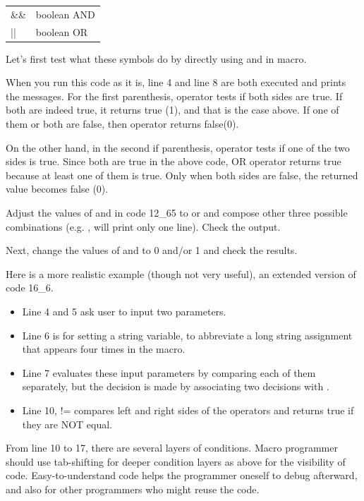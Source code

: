 \begin{indentCom}
 \begin{tabular*}{0.5\textwidth}{ l l }
\&\& & boolean AND\\
|| & boolean OR\\
\end{tabular*}
\end{indentCom}

Let's first test what these symbols do by directly using
 and  in macro.

When you run this code as it is, line 4 and line 8 are both executed and prints
the messages. For the first  parenthesis, \ilcom{\&\&} operator tests if
both sides are true. If both are indeed true, it returns true (1), and that is
the case above. If one of them or both are false, then \ilcom{\&\&}
operator returns false(0). 

On the other hand, in the second if parenthesis,
\ilcom{||} operator tests if one of the two sides is true. Since both are
true in the above code, OR operator returns true because at least one of them is
true. Only when both sides are false, the returned value becomes false (0).

\begin{indentexercise}{1}
Adjust the values of  and  in code 12\_65 to  or  and
compose other three possible combinations (e.g. ,  will print
only one line). Check the output.

Next, change the values of  and  to 0 and/or
1 and check the results. 
\end{indentexercise}

Here is a more realistic example (though not very useful), an extended version
of code 16\_6.

\begin{itemize}
\item Line 4 and 5 ask user to input two parameters.
\item Line 6 is for setting a string variable, to abbreviate a long string assignment that appears four times in the macro.
\item Line 7 evaluates these input parameters by comparing each of them separately, but the decision is made by associating two decisions with \ilcom{\&\&}. 
\item Line 10, != compares left and right sides of the operators and returns true if they are NOT equal.   
\end{itemize}
From line 10 to 17, there are several layers of conditions. Macro programmer should use tab-shifting for deeper condition layers as above for the visibility of code. Easy-to-understand code helps the programmer oneself to debug afterward, and also for other programmers who might reuse the code.
